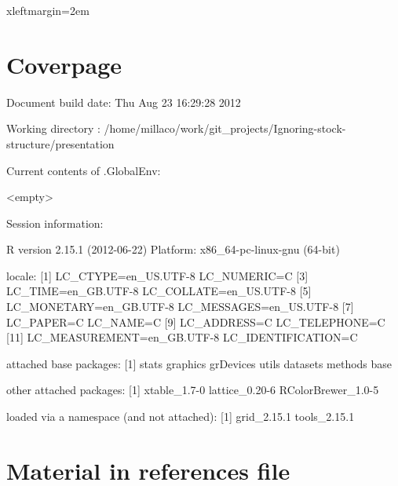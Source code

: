 \documentclass[a4paper,english]{article}
\begin{document}
 {xleftmargin=2em}
\renewenvironment{Schunk}{\vspace{\topsep}}{\vspace{\topsep}}

\section*{Coverpage}



\begin{Schunk}
\begin{Soutput}
Document build date: Thu Aug 23 16:29:28 2012 
\end{Soutput}
\begin{Soutput}
Working directory :
      /home/millaco/work/git_projects/Ignoring-stock-structure/presentation 
\end{Soutput}
\begin{Soutput}
Current contents of .GlobalEnv:
\end{Soutput}
\begin{Soutput}
     <empty>
\end{Soutput}
\begin{Soutput}
Session information:
\end{Soutput}
\begin{Soutput}
R version 2.15.1 (2012-06-22)
Platform: x86_64-pc-linux-gnu (64-bit)

locale:
 [1] LC_CTYPE=en_US.UTF-8       LC_NUMERIC=C              
 [3] LC_TIME=en_GB.UTF-8        LC_COLLATE=en_US.UTF-8    
 [5] LC_MONETARY=en_GB.UTF-8    LC_MESSAGES=en_US.UTF-8   
 [7] LC_PAPER=C                 LC_NAME=C                 
 [9] LC_ADDRESS=C               LC_TELEPHONE=C            
[11] LC_MEASUREMENT=en_GB.UTF-8 LC_IDENTIFICATION=C       

attached base packages:
[1] stats     graphics  grDevices utils     datasets  methods   base     

other attached packages:
[1] xtable_1.7-0       lattice_0.20-6     RColorBrewer_1.0-5

loaded via a namespace (and not attached):
[1] grid_2.15.1  tools_2.15.1
\end{Soutput}
\end{Schunk}

\section*{Material in references file}
\end{document}
